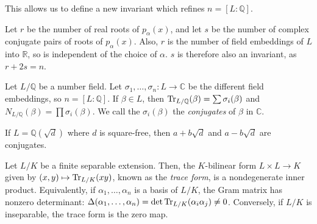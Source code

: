 This allows us to define a new invariant which refines \( n = [L:\mathbb Q] \).
\begin{definition}
    Let \( r \) be the number of real roots of \( p_\alpha(x) \), and let \( s \) be the number of complex conjugate pairs of roots of \( p_\alpha(x) \).
    Also, \( r \) is the number of field embeddings of \( L \) into \( \mathbb R \), so is independent of the choice of \( \alpha \).
    \( s \) is therefore also an invariant, as \( r + 2s = n \).
\end{definition}
\begin{lemma}
    Let \( L / \mathbb Q \) be a number field.
    Let \( \sigma_1, \dots, \sigma_n \colon L \to \mathbb C \) be the different field embeddings, so \( n = [L:\mathbb Q]\).
    If \( \beta \in L \), then \( \Tr_{L/\mathbb Q}(\beta) = \sum \sigma_i(\beta) \) and \( N_{L/\mathbb Q}(\beta) = \prod \sigma_i(\beta) \).
    We call the \( \sigma_i(\beta) \) the \emph{conjugates} of \( \beta \) in \( \mathbb C \).
\end{lemma}
\begin{example}
    If \( L = \mathbb Q(\sqrt d) \) where \( d \) is square-free, then \( a + b\sqrt d \) and \( a - b\sqrt d \) are conjugates.
\end{example}
\begin{proposition}
    Let \( L / K \) be a finite separable extension.
    Then, the \( K \)-bilinear form \( L \times L \to K \) given by \( (x, y) \mapsto \Tr_{L/K}(xy) \), known as the \emph{trace form}, is a nondegenerate inner product.
    Equivalently, if \( \alpha_1, \dots, \alpha_n \) is a basis of \( L / K \), the Gram matrix has nonzero determinant: \( \Delta(\alpha_1, \dots, \alpha_n) = \det \Tr_{L/K}(\alpha_i \alpha_j) \neq 0 \).
    Conversely, if \( L / K \) is inseparable, the trace form is the zero map.
\end{proposition}
